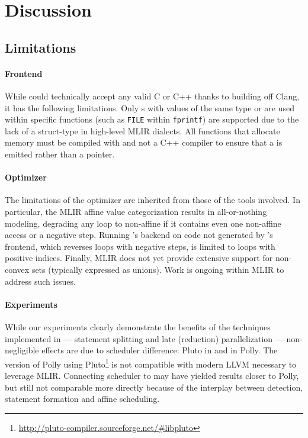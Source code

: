 \section{Discussion}

\subsection{Limitations}
\paragraph{Frontend}
While \tool could technically accept any valid C or C++ thanks to building off Clang, it has the following limitations. Only s with values of the same type or are used within specific functions (such as \texttt{FILE} within \texttt{fprintf}) are supported due to the lack of a struct-type in high-level MLIR dialects.  All functions that allocate memory must be compiled with \tool and not a C++ compiler to ensure that a \memref is emitted rather than a pointer.

\paragraph{Optimizer}
The limitations of the optimizer are inherited from those of the tools involved.
In particular, the MLIR affine value categorization results in all-or-nothing modeling, degrading any loop to non-affine if it contains even one non-affine access or a negative step. Running \tool's backend on code not generated by \tool's frontend, which reverses loops with negative steps, is limited to loops with positive indices. Finally, MLIR does not yet provide extensive support for non-convex sets (typically expressed as unions). Work is ongoing within MLIR to address such issues.

\paragraph{Experiments}
While our experiments clearly demonstrate the benefits of the techniques implemented in \tool --- statement splitting and late (reduction) parallelization --- non-negligible effects are due to scheduler difference: Pluto in \tool and  in Polly. The version of Polly using Pluto\footnote{\url{http://pluto-compiler.sourceforge.net/\#libpluto}} is not compatible with modern LLVM necessary to leverage MLIR. Connecting  scheduler to \tool may have yielded results closer to Polly, but still not comparable more directly because of the interplay between \scop detection, statement formation and affine scheduling.

